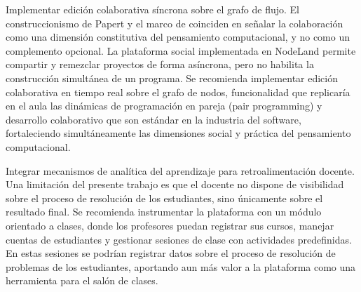 Implementar edición colaborativa síncrona sobre el grafo de flujo. El construccionismo de Papert y el marco de  coinciden en señalar la colaboración como una dimensión constitutiva del pensamiento computacional, y no como un complemento opcional. La plataforma social implementada en NodeLand permite compartir y remezclar proyectos de forma asíncrona, pero no habilita la construcción simultánea de un programa. Se recomienda implementar edición colaborativa en tiempo real sobre el grafo de nodos, funcionalidad que replicaría en el aula las dinámicas de programación en pareja (pair programming) y desarrollo colaborativo que son estándar en la industria del software, fortaleciendo simultáneamente las dimensiones social y práctica del pensamiento computacional.

Integrar mecanismos de analítica del aprendizaje para retroalimentación docente. Una limitación del presente trabajo es que el docente no dispone de visibilidad sobre el proceso de resolución de los estudiantes, sino únicamente sobre el resultado final. Se recomienda instrumentar la plataforma con un módulo orientado a clases, donde los profesores puedan registrar sus cursos, manejar cuentas de estudiantes y gestionar sesiones de clase con actividades predefinidas. En estas sesiones se podrían registrar datos sobre el proceso de resolución de problemas de los estudiantes, aportando aun más valor a la plataforma como una herramienta para el salón de clases.
 
